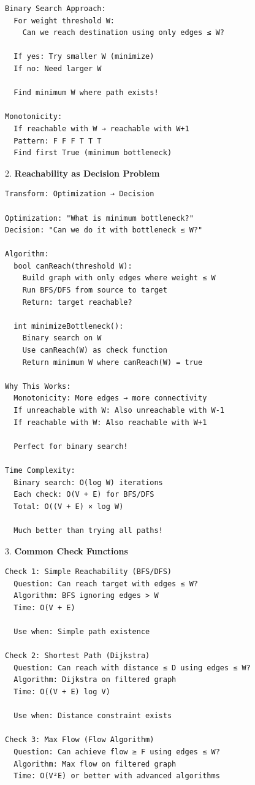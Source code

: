 \documentclass[11pt,a4paper,oneside]{book}
\begin{document}
\begin{tcolorbox}[
    enhanced,breakable,
    colback=white,
    colframe=deepblue,
    boxrule=1.5pt,
    arc=3mm,
    title=\textbf{The Bottleneck and Reachability Paradigm}
]
\begin{verbatim}
Binary Search Approach:
  For weight threshold W:
    Can we reach destination using only edges ≤ W?
  
  If yes: Try smaller W (minimize)
  If no: Need larger W
  
  Find minimum W where path exists!

Monotonicity:
  If reachable with W → reachable with W+1
  Pattern: F F F T T T
  Find first True (minimum bottleneck)
\end{verbatim}

2. \textbf{Reachability as Decision Problem}
\begin{verbatim}
Transform: Optimization → Decision

Optimization: "What is minimum bottleneck?"
Decision: "Can we do it with bottleneck ≤ W?"

Algorithm:
  bool canReach(threshold W):
    Build graph with only edges where weight ≤ W
    Run BFS/DFS from source to target
    Return: target reachable?
  
  int minimizeBottleneck():
    Binary search on W
    Use canReach(W) as check function
    Return minimum W where canReach(W) = true

Why This Works:
  Monotonicity: More edges → more connectivity
  If unreachable with W: Also unreachable with W-1
  If reachable with W: Also reachable with W+1
  
  Perfect for binary search!

Time Complexity:
  Binary search: O(log W) iterations
  Each check: O(V + E) for BFS/DFS
  Total: O((V + E) × log W)
  
  Much better than trying all paths!
\end{verbatim}

3. \textbf{Common Check Functions}
\begin{verbatim}
Check 1: Simple Reachability (BFS/DFS)
  Question: Can reach target with edges ≤ W?
  Algorithm: BFS ignoring edges > W
  Time: O(V + E)
  
  Use when: Simple path existence

Check 2: Shortest Path (Dijkstra)
  Question: Can reach with distance ≤ D using edges ≤ W?
  Algorithm: Dijkstra on filtered graph
  Time: O((V + E) log V)
  
  Use when: Distance constraint exists

Check 3: Max Flow (Flow Algorithm)
  Question: Can achieve flow ≥ F using edges ≤ W?
  Algorithm: Max flow on filtered graph
  Time: O(V²E) or better with advanced algorithms
  

\end{verbatim}
\end{tcolorbox}
\end{document}
